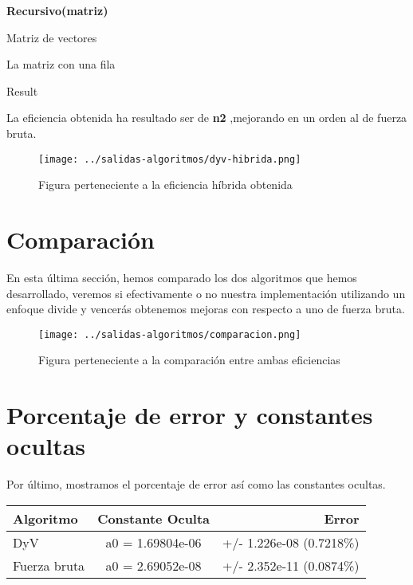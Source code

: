  \textbf{Recursivo(matriz)}
 \begin{algorithmic}	
 	\Require Matriz de vectores
 	
 	\Return La matriz con una fila
 	
 	\Return Result
 	\EndIf
 	
 \end{algorithmic}	
 
 	La eficiencia obtenida ha resultado ser de \textbf{n2} ,mejorando en un orden al de fuerza bruta.
 	\begin{figure}[H]
 		\centering
 		\texttt{[image: ../salidas-algoritmos/dyv-hibrida.png]}
 		\caption{Figura perteneciente a la eficiencia híbrida obtenida}
 		\label{fig:fuerzabruta-hibrida}
 	\end{figure}
 	
 \section{Comparación} %
 	En esta última sección, hemos comparado los dos algoritmos que hemos desarrollado, veremos si efectivamente o no nuestra implementación utilizando un enfoque divide y vencerás obtenemos mejoras con respecto a uno de fuerza bruta.
 	
 

 	\begin{figure}[H]
 		\centering
 		\texttt{[image: ../salidas-algoritmos/comparacion.png]}
 		\caption{Figura perteneciente a la comparación entre ambas eficiencias}
 		\label{fig:fuerzabruta-hibrida}
 	\end{figure}

\section{Porcentaje de error y constantes ocultas}
Por último, mostramos el porcentaje de error así como las constantes ocultas.\\
\begin{center}
	\begin{tabular}{| l | c | r |}
		\hline
		\textbf{Algoritmo} & \textbf{Constante Oculta} & \textbf{Error} \\ \hline
		DyV & a0 = 1.69804e-06  & +/- 1.226e-08    (0.7218\%)\\ 
		\hline
		Fuerza bruta & a0 = 2.69052e-08 & +/- 2.352e-11    (0.0874\%)
		
	\end{tabular}
\end{center}



